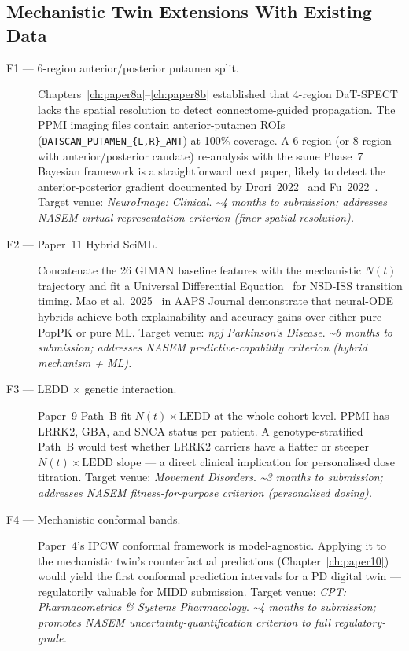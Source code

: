 \subsection{Mechanistic Twin Extensions With Existing Data}
\label{sec:conc-mt-extensions}

\begin{description}
  \item[F1 --- 6-region anterior/posterior putamen split.] Chapters~\ref{ch:paper8a}--\ref{ch:paper8b} established that 4-region DaT-SPECT lacks the spatial resolution to detect connectome-guided propagation. The PPMI imaging files contain anterior-putamen ROIs (\texttt{DATSCAN\_PUTAMEN\_\{L,R\}\_ANT}) at 100\% coverage. A 6-region (or 8-region with anterior/posterior caudate) re-analysis with the same Phase~7 Bayesian framework is a straightforward next paper, likely to detect the anterior-posterior gradient documented by Drori~2022~\cite{drori2022} and Fu~2022~\cite{fu2022}. Target venue: \emph{NeuroImage: Clinical}. \emph{\textasciitilde4 months to submission; addresses NASEM virtual-representation criterion (finer spatial resolution).}

  \item[F2 --- Paper~11 Hybrid SciML.] Concatenate the 26 GIMAN baseline features with the mechanistic $N(t)$ trajectory and fit a Universal Differential Equation~\cite{rackauckas2020universal} for NSD-ISS transition timing. Mao et al.~2025~\cite{mao2025nonmem} in AAPS Journal demonstrate that neural-ODE hybrids achieve both explainability and accuracy gains over either pure PopPK or pure ML. Target venue: \emph{npj Parkinson's Disease}. \emph{\textasciitilde6 months to submission; addresses NASEM predictive-capability criterion (hybrid mechanism + ML).}

  \item[F3 --- LEDD $\times$ genetic interaction.] Paper~9 Path~B fit $N(t) \times \mathrm{LEDD}$ at the whole-cohort level. PPMI has LRRK2, GBA, and SNCA status per patient. A genotype-stratified Path~B would test whether LRRK2 carriers have a flatter or steeper $N(t) \times \mathrm{LEDD}$ slope --- a direct clinical implication for personalised dose titration. Target venue: \emph{Movement Disorders}. \emph{\textasciitilde3 months to submission; addresses NASEM fitness-for-purpose criterion (personalised dosing).}

  \item[F4 --- Mechanistic conformal bands.] Paper~4's IPCW conformal framework is model-agnostic. Applying it to the mechanistic twin's counterfactual predictions (Chapter~\ref{ch:paper10}) would yield the first conformal prediction intervals for a PD digital twin --- regulatorily valuable for MIDD submission. Target venue: \emph{CPT: Pharmacometrics \& Systems Pharmacology}. \emph{\textasciitilde4 months to submission; promotes NASEM uncertainty-quantification criterion to full regulatory-grade.}
\end{description}

